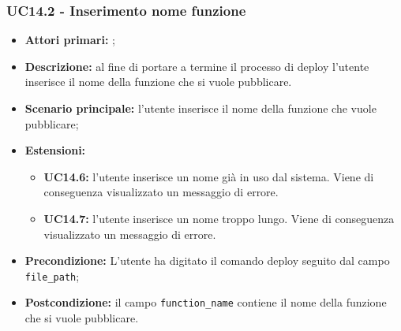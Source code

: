 \subsubsection{UC14.2 - Inserimento nome funzione}
\begin{itemize}
	\item \textbf{Attori primari:} \us{};
	\item \textbf{Descrizione:} al fine di portare a termine il processo di deploy l’utente inserisce il nome della funzione che si vuole pubblicare.  
	\item \textbf{Scenario principale:} l'utente inserisce il nome della funzione che vuole pubblicare;
	\item \textbf{Estensioni:} 
	\begin{itemize}
		\item \textbf{UC14.6:} l’utente inserisce un nome già in uso dal sistema. Viene di conseguenza visualizzato un messaggio di errore. 
		\item \textbf{UC14.7:} l’utente inserisce un nome troppo lungo. Viene di conseguenza visualizzato un messaggio di errore. 
	\end{itemize}
	\item \textbf{Precondizione:} L’utente ha digitato il comando deploy seguito dal campo \texttt{file\_path};
	\item \textbf{Postcondizione:} il campo \texttt{function\_name} contiene il nome della funzione che si vuole pubblicare.
\end{itemize}